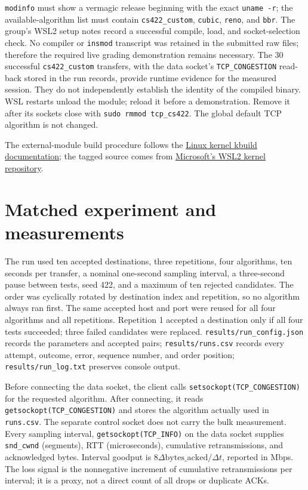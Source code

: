 \documentclass[11pt,letterpaper]{article}
\begin{document}
\texttt{modinfo} must show a vermagic release beginning with the exact
\texttt{uname -r}; the available-algorithm list must contain
\texttt{cs422\_custom}, \texttt{cubic}, \texttt{reno}, and \texttt{bbr}. The group's
WSL2 setup notes record a successful compile, load, and socket-selection
check. No compiler or \texttt{insmod} transcript was retained in the submitted
raw files; therefore the required live grading demonstration remains necessary.
The 30 successful \texttt{cs422\_custom} transfers, with the data socket's
\texttt{TCP\_CONGESTION} read-back stored in the run records, provide runtime
evidence for the measured session. They do not independently establish the
identity of the compiled binary. WSL restarts unload the module; reload it
before a demonstration. Remove it after its sockets close with
\texttt{sudo rmmod tcp\_cs422}. The global default TCP algorithm is not changed.

The external-module build procedure follows the
\href{https://docs.kernel.org/kbuild/modules.html}{Linux kernel kbuild documentation};
the tagged source comes from
\href{https://github.com/microsoft/WSL2-Linux-Kernel}{Microsoft's WSL2 kernel repository}.

\section{Matched experiment and measurements}
The run used ten accepted destinations, three repetitions, four algorithms,
ten seconds per transfer, a nominal one-second sampling interval, a three-second
pause between tests, seed 422, and a maximum of ten rejected candidates. The
order was cyclically rotated by destination index and repetition, so no
algorithm always ran first. The same accepted host and port were reused for
all four algorithms and all repetitions. Repetition 1 accepted a destination
only if all four tests succeeded; three failed candidates were replaced.
\texttt{results/run\_config.json} records the parameters and accepted pairs;
\texttt{results/runs.csv} records every attempt, outcome, error, sequence number,
and order position; \texttt{results/run\_log.txt} preserves console output.

Before connecting the data socket, the client calls
\texttt{setsockopt(TCP\_CONGESTION)} for the requested algorithm. After connecting,
it reads \texttt{getsockopt(TCP\_CONGESTION)} and stores the algorithm actually
used in \texttt{runs.csv}. The separate control socket does not carry the bulk
measurement. Every sampling interval, \texttt{getsockopt(TCP\_INFO)} on the data
socket supplies \texttt{snd\_cwnd} (segments), RTT (microseconds), cumulative
retransmissions, and acknowledged bytes. Interval goodput is
$8\Delta\mathrm{bytes\_acked}/\Delta t$, reported in Mbps. The loss signal is
the nonnegative increment of cumulative retransmissions per interval; it is
a proxy, not a direct count of all drops or duplicate ACKs.
\end{document}
